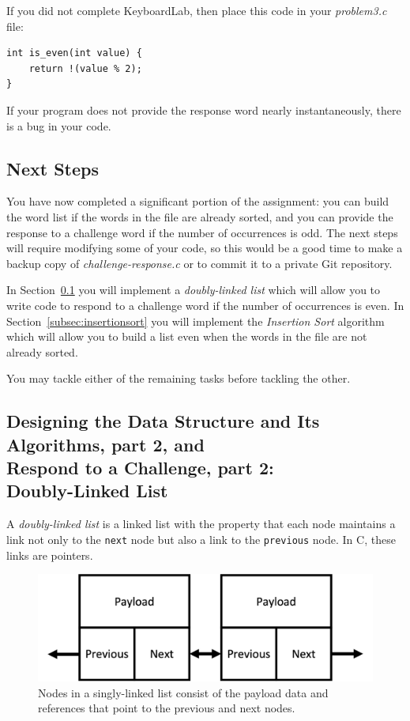 If you did not complete KeyboardLab, then place this code in your \textit{problem3.c} file:

\begin{lstlisting}
int is_even(int value) {
    return !(value % 2);
}
\end{lstlisting}

If your program does not provide the response word nearly instantaneously, there is a bug in your code.

\subsection*{Next Steps}

You have now completed a significant portion of the assignment: you can build the word list if the words in the file are already sorted, and you can provide the response to a challenge word if the number of occurrences is odd.
The next steps will require modifying some of your code, so this would be a good time to make a backup copy of \textit{challenge-response.c} or to commit it to a private Git repository.

In Section~\ref{subsec:doublylinkedlist} you will implement a \textit{doubly-linked list} which will allow you to write code to respond to a challenge word if the number of occurrences is even.
In Section~\ref{subsec:insertionsort} you will implement the \textit{Insertion Sort} algorithm which will allow you to build a list even when the words in the file are not already sorted.

You may tackle either of the remaining tasks before tackling the other.

\subsection{Designing the Data Structure and Its Algorithms, part 2, and \\ Respond to a Challenge, part 2: \\ Doubly-Linked List} \label{subsec:doublylinkedlist}

A \textit{doubly-linked list} is a linked list with the property that each node maintains a link not only to the \lstinline{next} node but also a link to the \lstinline{previous} node.
In C, these links are pointers.

\begin{figure}[h]
    \centering
    \includegraphics[scale=0.5]{doubly-linked-list}
    \caption{Nodes in a singly-linked list consist of the payload data and references that point to the previous and next nodes.}
\end{figure}

